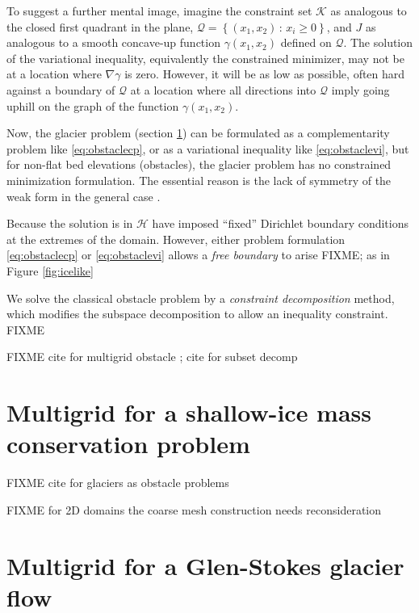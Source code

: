 \documentclass[letterpaper,final,12pt,reqno]{amsart}
\begin{document}
To suggest a further mental image, imagine the constraint set $\mathcal{K}$ as analogous to the closed first quadrant in the plane, $\mathcal{Q} = \left\{(x_1,x_2)\,:\,x_i\ge 0\right\}$, and $J$ as analogous to a smooth concave-up function $\gamma(x_1,x_2)$ defined on $\mathcal{Q}$.  The solution of the variational inequality, equivalently the constrained minimizer, may not be at a location where $\nabla \gamma$ is zero.  However, it will be as low as possible, often hard against a boundary of $\mathcal{Q}$ at a location where all directions into $\mathcal{Q}$ imply going uphill on the graph of the function $\gamma(x_1,x_2)$.

Now, the glacier problem (section \ref{sec:sia}) can be formulated as a complementarity problem like \eqref{eq:obstaclecp}, or as a variational inequality like \eqref{eq:obstaclevi}, but for non-flat bed elevations (obstacles), the glacier problem has no constrained minimization formulation.  The essential reason is the lack of symmetry of the weak form in the general case \cite{JouvetBueler2012}.

Because the solution is in $\mathcal{H}$ have imposed ``fixed'' Dirichlet boundary conditions at the extremes of the domain.  However, either problem formulation \eqref{eq:obstaclecp} or \eqref{eq:obstaclevi} allows a \emph{free boundary} to arise FIXME; as in Figure \ref{fig:icelike}

We solve the classical obstacle problem by a \emph{constraint decomposition} \cite{Tai2003} method, which modifies the subspace decomposition to allow an inequality constraint.  FIXME

FIXME cite for multigrid obstacle \cite{BrandtCryer1983,Bueler2021,GraeserKornhuber2009,Jouvetetal2013}; cite for subset decomp \cite{Tai2003}


\section{Multigrid for a shallow-ice mass conservation problem} \label{sec:sia}

FIXME cite for glaciers as obstacle problems \cite{Bueler2016,Bueler2020,Calvoetal2002,JouvetBueler2012}

FIXME for 2D domains the coarse mesh construction needs reconsideration

\section{Multigrid for a Glen-Stokes glacier flow} \label{sec:stokes}
\end{document}
